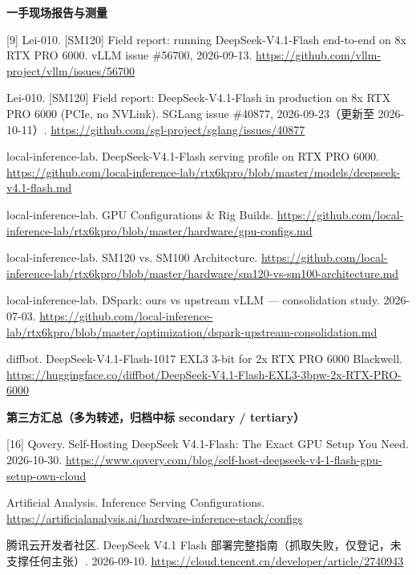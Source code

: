 \begin{refs}
\noindent\textbf{一手现场报告与测量}\par
\vspace{2pt}
[9] Lei-010. [SM120] Field report: running DeepSeek-V4.1-Flash end-to-end on 8x RTX PRO 6000. vLLM issue \#56700, 2026-09-13. \url{https://github.com/vllm-project/vllm/issues/56700}\par
[10] Lei-010. [SM120] Field report: DeepSeek-V4.1-Flash in production on 8x RTX PRO 6000 (PCIe, no NVLink). SGLang issue \#40877, 2026-09-23（更新至 2026-10-11）. \url{https://github.com/sgl-project/sglang/issues/40877}\par
[11] local-inference-lab. DeepSeek-V4.1-Flash serving profile on RTX PRO 6000. \url{https://github.com/local-inference-lab/rtx6kpro/blob/master/models/deepseek-v4.1-flash.md}\par
[12] local-inference-lab. GPU Configurations \& Rig Builds. \url{https://github.com/local-inference-lab/rtx6kpro/blob/master/hardware/gpu-configs.md}\par
[13] local-inference-lab. SM120 vs. SM100 Architecture. \url{https://github.com/local-inference-lab/rtx6kpro/blob/master/hardware/sm120-vs-sm100-architecture.md}\par
[14] local-inference-lab. DSpark: ours vs upstream vLLM --- consolidation study. 2026-07-03. \url{https://github.com/local-inference-lab/rtx6kpro/blob/master/optimization/dspark-upstream-consolidation.md}\par
[15] diffbot. DeepSeek-V4.1-Flash-1017 EXL3 3-bit for 2x RTX PRO 6000 Blackwell. \url{https://huggingface.co/diffbot/DeepSeek-V4.1-Flash-EXL3-3bpw-2x-RTX-PRO-6000}\par
\vspace{5pt}

\noindent\textbf{第三方汇总（多为转述，归档中标 secondary / tertiary）}\par
\vspace{2pt}
[16] Qovery. Self-Hosting DeepSeek V4.1-Flash: The Exact GPU Setup You Need. 2026-10-30. \url{https://www.qovery.com/blog/self-host-deepseek-v4-1-flash-gpu-setup-own-cloud}\par
[17] Artificial Analysis. Inference Serving Configurations. \url{https://artificialanalysis.ai/hardware-inference-stack/configs}\par
[18] 腾讯云开发者社区. DeepSeek V4.1 Flash 部署完整指南（抓取失败，仅登记，未支撑任何主张）. 2026-09-10. \url{https://cloud.tencent.cn/developer/article/2740943}\par

\end{refs}
